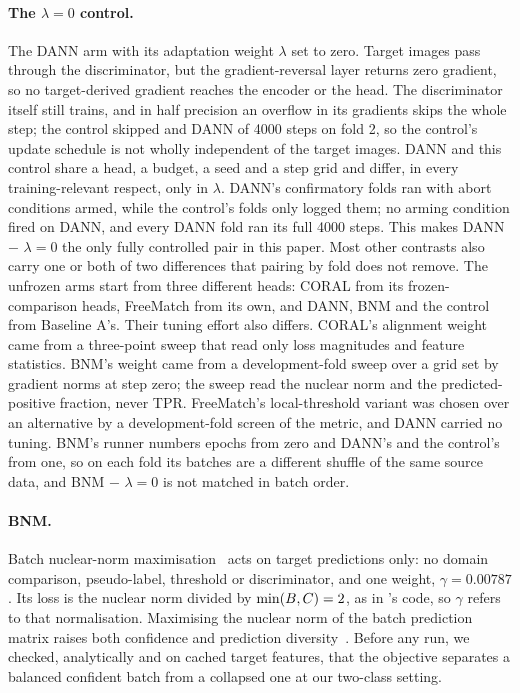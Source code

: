 \paragraph{The $\lambda=0$ control.} The DANN arm with its adaptation weight $\lambda$ set to
zero. Target images pass through the discriminator, but the gradient-reversal layer returns
zero gradient, so no target-derived gradient reaches the encoder or the head. The
discriminator itself still trains, and in half precision an overflow in its gradients skips the
whole step; the control skipped \lamSkipFoldTwo{} and DANN \dannSkipFoldTwo{} of 4000 steps on
fold 2, so the control's update schedule is not wholly independent of the target images. DANN and this
control share a head, a budget, a seed and a step grid and differ, in every training-relevant
respect, only in $\lambda$. DANN's confirmatory folds ran with abort conditions armed, while the
control's folds only logged them; no arming condition fired on DANN, and every DANN fold ran its
full 4000 steps. This makes DANN $-$ $\lambda=0$ the only fully controlled pair in this paper. Most other contrasts
also carry one or both of two differences that pairing by fold does not remove. The unfrozen arms start
from three different heads: CORAL from its frozen-comparison heads, FreeMatch from its own,
and DANN, BNM and the control from Baseline A's. Their tuning effort also differs. CORAL's
alignment weight came from a three-point sweep that read only loss magnitudes and feature
statistics. BNM's weight came from a development-fold sweep over a grid set by gradient norms
at step zero; the sweep read the nuclear norm and the predicted-positive fraction, never TPR.
FreeMatch's local-threshold variant was chosen over an alternative by a development-fold
screen of the metric, and DANN carried no tuning. BNM's runner numbers epochs from zero and
DANN's and the control's from one, so on each fold its batches are a different shuffle of the
same source data, and BNM $-$ $\lambda=0$ is not matched in batch order.

\paragraph{BNM.} Batch nuclear-norm maximisation~\citep{cui2020bnm} acts on target predictions
only: no domain comparison, pseudo-label, threshold or discriminator, and one weight,
$\gamma = 0.00787$. Its loss is the nuclear norm divided by $\min(B, C) = 2{}$, as
in \citeauthor{cui2020bnm}'s code, so $\gamma$ refers to that normalisation. Maximising the nuclear norm of the batch prediction matrix raises both
confidence and prediction diversity~\citep{cui2020bnm}. Before any run, we checked,
analytically and on cached target features, that the objective separates a balanced confident batch from a collapsed one at
our two-class setting.

